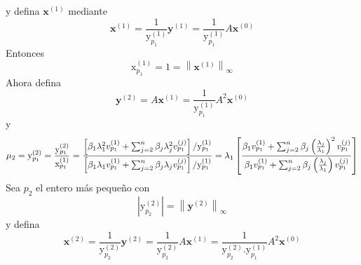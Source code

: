 \documentclass[12pt, a4paper]{article}
\numberwithin{subsection}{section} %
\begin{document}
        y defina $\textbf{x}^{\left( 1 \right)}$ mediante
        \begin{equation*}
        \textbf{x}^{\left( 1 \right)} = \frac{ 1 }{ \text{y}_{p_{1}}^{\left( 1 \right)} } \textbf{y}^{\left( 1 \right)} = \frac{ 1 }{ \text{y}_{p_{1}}^{\left( 1 \right)} } A \textbf{x}^{\left( 0 \right)}
        \end{equation*}
        Entonces
        \begin{equation*}
        \text{x}_{p_{1}}^{\left( 1 \right)} = 1 = \left\| \textbf{x}^{\left( 1 \right)} \right\|_{\infty }
        \end{equation*}
        Ahora defina
        \begin{equation*}
        \textbf{y}^{\left( 2 \right)} = A\textbf{x}^{\left( 1 \right)} = \frac{1}{\text{y}_{p_{1}}^{\left( 1 \right)}} A^{2}\textbf{x}^{\left( 0 \right)}
        \end{equation*}
        y
        \begin{equation*}
        \mu_{2} = \text{y}_{p_{1}}^{\left( 2 \right)} = \frac{\text{y}_{p_{1}}^{\left( 2 \right)}}{\text{x}_{p_{1}}^{\left( 1 \right)}} = \frac{\left[ \beta_{1} \lambda_{1}^{2} v_{p_{1}}^{\left( 1 \right)}+\sum_{j = 2}^{n}\beta_{j} \lambda_{j}^{2} v_{p_{1}}^{\left( j \right)} \right] \huge / \normalsize \text{y}_{p_{1}}^{\left( 1 \right)}}{\left[ \beta_{1} \lambda_{1} v_{p_{1}}^{\left( 1 \right)}+\sum_{j = 2}^{n}\beta_{j} \lambda_{j} v_{p_{1}}^{\left( j \right)} \right] \huge / \normalsize \text{y}_{p_{1}}^{\left( 1 \right)}} = \lambda_{1} \left[ \frac{\beta_{1} v_{p_{1}}^{\left( 1 \right)}+\sum_{j = 2}^{n}\beta_{j} \left( \frac{\lambda_{j}}{\lambda_{1}} \right)^{2} v_{p_{1}}^{\left( j \right)}}{\beta_{1}  v_{p_{1}}^{\left( 1 \right)}+\sum_{j = 2}^{n}\beta_{j} \left( \frac{\lambda_{j}}{\lambda_{1}} \right) v_{p_{1}}^{\left( j \right)}} \right]
        \end{equation*}
        Sea $p_{2}$ el entero más pequeño con
        \begin{equation*}
        \left| \text{y}_{p_{2}}^{\left( 2 \right)} \right| = \left\| \textbf{y}^{\left( 2 \right)} \right\|_{\infty }
        \end{equation*}
        y defina
        \begin{equation*}
        \textbf{x}^{\left( 2 \right)} = \frac{1}{\text{y}_{p_{2}}^{\left( 2 \right)}} \textbf{y}^{\left( 2 \right)} = \frac{1}{\text{y}_{p_{2}}^{\left( 2 \right)}} A\textbf{x}^{\left( 1 \right)} = \frac{1}{\text{y}_{p_{2}}^{\left( 2 \right)} . \text{y}_{p_{1}}^{\left( 1 \right)}} A^{2}\textbf{x}^{\left( 0 \right)}
        \end{equation*}
\end{document}
